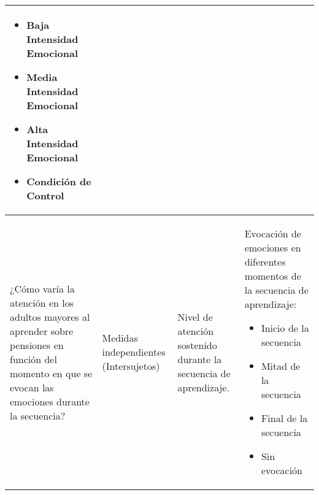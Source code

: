 \begin{longtable}{| m{5cm} | m{2cm} | m{3cm} | m{5cm} |}
\begin{itemize}
    \item Baja Intensidad Emocional
    \item Media Intensidad Emocional
    \item Alta Intensidad Emocional
    \item Condición de Control
\end{itemize} \\ \hline
¿Cómo varía la atención en los adultos mayores al aprender sobre pensiones en función del momento en que se evocan las emociones durante la secuencia? &Medidas independientes (Intersujetos) & Nivel de atención sostenido durante la secuencia de aprendizaje. & Evocación de emociones en diferentes momentos de la secuencia de aprendizaje: \begin{itemize}
    \item Inicio de la secuencia
    \item Mitad de la secuencia
    \item Final de la secuencia
    \item Sin evocación
\end{itemize}  \\ \hline
\end{longtable}